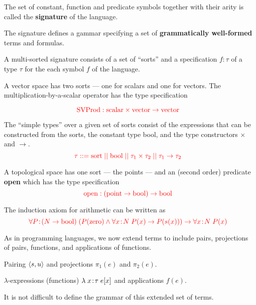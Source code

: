 {\vfill
The set of constant, function and predicate symbols together with their arity is called the {\bf signature} of the language.

\vfill
The signature defines a gammar specifying a set of {\bf grammatically well-formed} terms and formulas.


{\huge
A multi-sorted signature consists of a set of ``sorts'' and a specification $f\!:\!\tau$ of a type $\tau$ for the each symbol $f$ of the language.

\vfill
A vector space has two sorts --- one for scalars and one for vectors.
The multiplication-by-a-scalar operator has the type specification

$${\color{red}\mathrm{SVProd}: \mathrm{scalar} \times \mathrm{vector} \rightarrow \mathrm{vector}}$$
}


The ``simple types'' over a given set of sorts consist of the expressions that can be constructed from the sorts, the constant type bool, and
the type constructors $\times$ and $\rightarrow$.
$${\color{red} \tau ::= \mathrm{sort} \;||\; \mathrm{bool} \;||\; \tau_1 \times \tau_2 \;||\; \tau_1 \rightarrow \tau_2}$$


\vfill
A topological space has one sort --- the points --- and an (second order) predicate {\bf open} which has the type specification
$${\color{red}\mathrm{open}:(\mathrm{point}\rightarrow\mathrm{bool})\rightarrow\mathrm{bool}}$$

\vfill
The induction axiom for arithmetic can be written as
$${\color{red}\forall P\!:\!\left(N\rightarrow\mathrm{bool})\;(P(\mathrm{zero}) \wedge \forall x\!:\!N\;P(x)\rightarrow P(s(x))\right) \rightarrow \forall x\!:\!N \;P(x)}$$


As in programming languages, we now extend terms to include pairs, projections of pairs, functions, and applications of functions.

\vfill
Pairing {\color{red} ${\mbox{$\langle s,u\rangle$}}$} and projections {\color{red} $\pi_1(e)$} and {\color{red} $\pi_2(e)$}.

\vfill
$\lambda$-expressions (functions) {\color{red} $\lambda\; x\!:\!\tau\;e[x]$} and applications {\color{red} $f(e)$}.

\vfill
It is not difficult to define the grammar of this extended set of terms.

}
